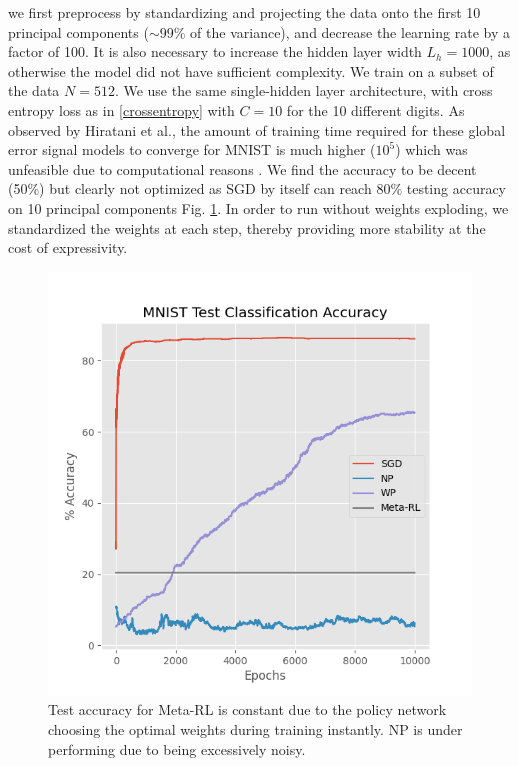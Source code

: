 \documentclass{article}
\begin{document}
we first preprocess by standardizing and projecting the
data onto the first 10 principal components ($\sim99\%$ of the variance), and decrease the learning rate 
by a factor of 100. It is also necessary to increase the hidden layer width $L_h = 1000$, as otherwise the model did not
have sufficient complexity. We train on a subset of the data $N=512$. We use the same single-hidden layer architecture, with cross entropy loss as in \ref{crossentropy} with $C=10$ for the 10 different digits. As observed by Hiratani et al., the amount of training time required 
for these global error signal models to converge for MNIST is much higher ($10^5$) which was unfeasible due to computational reasons \cite{hiratani2022on}.
We find the accuracy to be decent (50\%) but clearly not optimized as SGD by itself can reach $80\%$ testing accuracy on 10
principal components Fig. \ref{fig:mnistacc}. In order to run without weights exploding, we standardized the weights at each step, thereby providing more stability at the cost of expressivity. 

\begin{figure}
  \centering
  \includegraphics[scale=0.6]{acc}  \caption{Test accuracy for Meta-RL is constant due to the policy network choosing the optimal weights during training instantly. NP is under performing due to being excessively noisy.  \label{fig:mnistacc}}
\end{figure}
\end{document}
